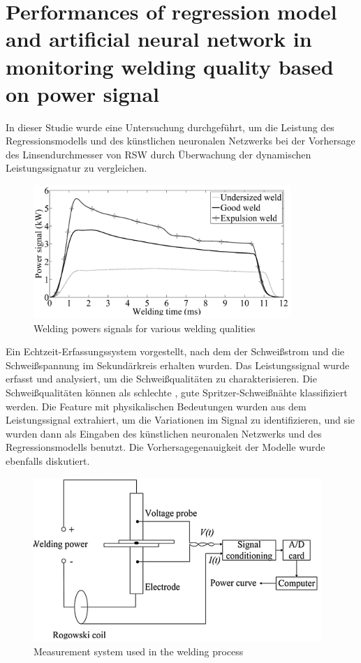 \documentclass[english,ngerman]{tudscrreprt}
\begin{document}
\section{Performances of regression model and artificial neural network in monitoring welding quality based on power signal\cite{Zhao.2020}}
In dieser Studie wurde eine Untersuchung durchgeführt, um die Leistung des Regressionsmodells und des künstlichen neuronalen Netzwerks bei der Vorhersage des Linsendurchmesser von RSW durch Überwachung der dynamischen Leistungssignatur zu vergleichen.
\begin{figure}[H]
\centering
\includegraphics[scale = 1]{./Bilder/Welding powers signals for various welding qualities.png}
\caption{Welding powers signals for various welding qualities}\label{fgg:P}
\end{figure}
Ein Echtzeit-Erfassungssystem vorgestellt, nach dem der Schweißstrom und die Schweißspannung im Sekundärkreis erhalten wurden. Das Leistungssignal wurde erfasst und analysiert, um die Schweißqualitäten zu charakterisieren. Die Schweißqualitäten können als schlechte , gute Spritzer-Schweißnähte klassifiziert werden. Die Feature mit physikalischen Bedeutungen wurden aus dem Leistungssignal extrahiert, um die Variationen im Signal zu identifizieren, und sie wurden dann als Eingaben des künstlichen neuronalen Netzwerks und des Regressionsmodells benutzt. Die Vorhersagegenauigkeit der Modelle wurde ebenfalls diskutiert.\\
\begin{figure}[H]
\centering
\includegraphics[scale = 1]{./Bilder/Measurement system used in the welding process.png}
\caption{Measurement system used in the welding process}\label{fgg:P}
\end{figure}
\end{document}
